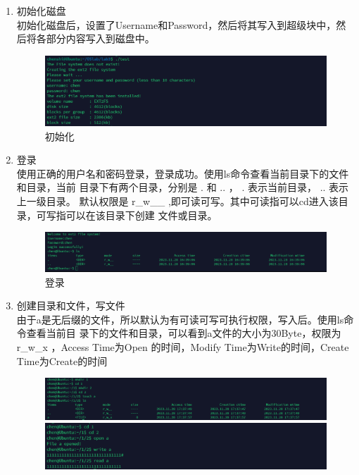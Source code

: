 \documentclass{article}
\begin{document}
    \begin{enumerate}
        \item 初始化磁盘\\
        初始化磁盘后，设置了Username和Password，然后将其写入到超级块中，然后将各部分内容写入到磁盘中。
        
        \begin{figure}[htbp]
            \centering
            \includegraphics[scale=0.9]{picture/26.png}
            \caption{初始化}
            \label{25}
        \end{figure}

        \item 登录\\
        使用正确的用户名和密码登录，登录成功。使用ls命令查看当前目录下的文件和目录，当前
        目录下有两个目录，分别是 . 和 .. ， . 表示当前目录， .. 表示上一级目录。
        默认权限是 r\_w\_\_ ,即可读可写。其中可读指可以cd进入该目录，可写指可以在该目录下创建
        文件或目录。

        \begin{figure}[htbp]
            \centering
            \includegraphics[scale=0.9]{picture/27.png}
            \caption{登录}
            \label{26}
        \end{figure}

        \item 创建目录和文件，写文件\\
        由于a是无后缀的文件，所以默认为有可读可写可执行权限，写入后。使用ls命令查看当前目
        录下的文件和目录，可以看到a文件的大小为30Byte，权限为 r\_w\_x ，Access Time为Open
        的时间，Modify Time为Write的时间，Create Time为Create的时间

        \begin{figure}[htbp]
            \centering
            \includegraphics[scale=0.9]{picture/28.png}
            \includegraphics[scale=0.9]{picture/29.png}


\end{figure}
\end{enumerate}
\end{document}
